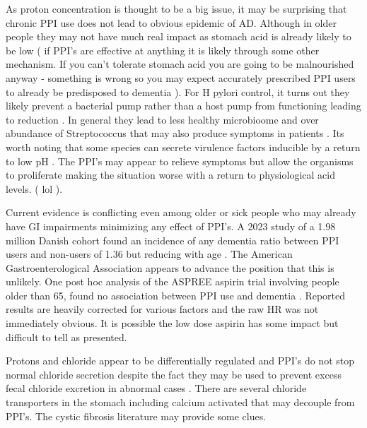 As proton concentration is thought to be a big issue, 
it may be surprising that chronic PPI use does not 
lead to obvious epidemic of 
AD. Although in older people they may not have
much real impact as stomach acid is already likely
to be low ( if PPI's  are effective at anything 
it is likely through some other mechanism. If you can't tolerate
stomach acid you are going to be malnourished anyway  - something
is wrong  so you may expect accurately prescribed PPI users
to already be predisposed to dementia   ).  
For H pylori control, it turns out they likely prevent
a bacterial pump rather than a host pump from functioning 
leading to reduction \cite{BLANDONARIAS2025388}. 
In general they lead to less healthy microbioome
and over abundance of Streptococcus that may also
produce symptoms in patients \cite{Minalyan2017}.
Its worth noting that some species can secrete virulence
factors inducible by a return to low pH
\cite{Do_Makthal_VanderWal_Environmental_peptide_2019}.
The PPI's may appear to relieve symptoms but allow the organisms
to proliferate making the situation worse with a return
to physiological acid levels. ( lol ).

Current evidence is conflicting even among older or
sick people who may already have GI impairments minimizing
any effect of PPI's. A 2023 study of a 1.98 million Danish
cohort found an incidence of any dementia ratio between
PPI users and non-users of 1.36 but reducing with age
\cite{Pourhadi_Janbek_JensenDahm_Proton_pump_inhibitors_2024}.
The American Gastroenterological Association appears to 
advance the position that this is unlikely.
One post hoc analysis of the ASPREE aspirin trial involving
people older than 65, found no
association between PPI use and dementia
\cite{PMC10527011}. Reported results are heavily corrected for
various factors and the raw HR was not immediately obvious. 
It is possible the low dose aspirin has some impact but
difficult to tell as presented. 

Protons and chloride appear to be differentially regulated
and PPI's do not stop normal chloride secretion 
\cite{Coskun_Baumgartner_Chu_Coordinated_regulation_gastric_2002}
despite the fact they may be used to prevent excess fecal
chloride excretion in abnormal cases
\cite{Aichbichler_Zerr_SantaAna_Proton_Pump_Inhibition_1997}.
There are several chloride transporters in the stomach
including calcium activated
\cite{Raut_Singh_Sanghvi_Chloride_ions_health_2024} 
that may decouple from PPI's. The cystic fibrosis
literature  may provide some clues.


